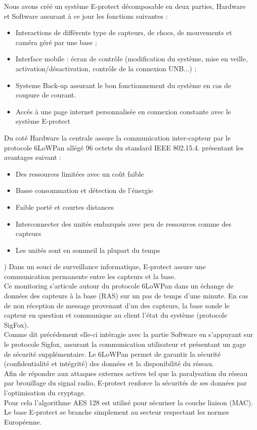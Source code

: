Nous avons créé un système E-protect décomposable en deux parties, Hardware et Software assurant à ce jour les fonctions suivantes :
\begin{itemize}
\item Interactions de différents type de capteurs, de chocs, de mouvements et caméra géré par une base ;
\item Interface mobile : écran de contrôle (modification du système, mise en veille, activation/désactivation, contrôle de la connexion UNB...) ;
\item Systeme Back-up assurant le bon fonctionnement du système en cas de coupure de courant.
\item Accés à une page internet personnalisée en connexion constante avec le système E-protect\\
\end{itemize}
Du coté Hardware la centrale assure la communication inter-capteur par le protocole 6LoWPan allégé 96 octets du standard IEEE 802.15.4. présentant les avantages suivant :\\
\begin{itemize}
\item Des ressources limitées avec un coût faible
\item Basse consommation et détection de l'énergie 
\item Faible porté et courtes distances
\item Interconnecter des unités embarqués avec peu de ressources comme des capteurs
\item Les unités sont en sommeil la plupart du temps\\
\end{itemize})
Dans un souci de surveillance informatique, E-protect assure une communication permanente entre les capteurs et la base.\\
Ce monitoring s’articule autour du protocole 6LoWPan dans un échange de données des capteurs à la base (RAS) sur un pas de temps d’une minute. En cas de non réception de message provenant d’un des capteurs, la base sonde le capteur en question et communique au client l’état du système (protocole SigFox).\\

Comme dit précédement elle-ci intéragie avec la partie Software en s'appuyant sur le protocole Sigfox, assurant la communication utilisateur et présentant un gage de sécurité supplémentaire. Le 6LoWPan permet de garantir la sécurité (confidentialité et intégrité) des données et la disponibilité du réseau. \\
Afin de répondre aux attaques externes actives tel que la paralysation du réseau par brouillage du signal radio, E-protect renforce la sécurités de ses données par l'optimisation du cryptage.\\
Pour cela l'algorithme AES 128 est utilisé pour sécuriser la couche liaison (MAC).\\

Le base E-protect se branche simplement au secteur respectant les normes Européenne.\\


